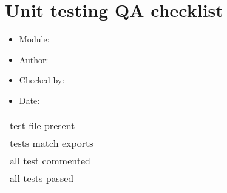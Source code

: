 \documentclass[14pt]{article}
\begin{document}
\section*{Unit testing QA checklist}
\Large
\begin{itemize}
\item Module:
\item Author:
\item Checked by:
\item Date:
\end{itemize}
\Large
\begin{tabularx}{\textwidth}{ X | X }
test file present & \\
tests match exports & \\
all test commented & \\
all tests passed & \\
\end{tabularx}
\end{document}
